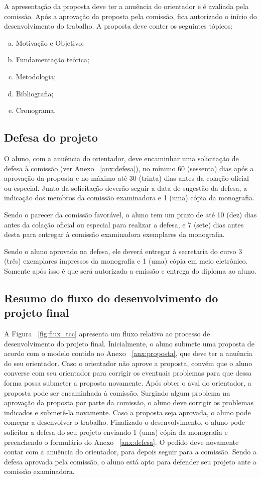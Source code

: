 A apresentação da proposta deve ter a anuência do orientador e é avaliada pela comissão. Após a 
aprovação da proposta pela comissão, fica autorizado o início do desenvolvimento do trabalho.
A proposta deve conter os seguintes tópicos:

\begin{enumerate}[a.]
\item Motivação e Objetivo;
\item Fundamentação teórica;
\item Metodologia;
\item Bibliografia;
\item Cronograma.
\end{enumerate}

\subsection{Defesa do projeto}
\label{sec:defesa}
O aluno, com a anuência do orientador, deve encaminhar uma solicitação de defesa
à comissão (ver Anexo ~\ref{anx:defesa}), no mínimo 60 (sessenta) dias após a aprovação da proposta e no máximo 
até 30 (trinta) dias antes da colação oficial ou especial.
Junto da solicitação deverão seguir a data de sugestão da defesa, a indicação
dos membros da comissão examinadora e 1 (uma) cópia da monografia.

Sendo o parecer da comissão favorável, o aluno tem um prazo de até 10 (dez)
dias antes da colação oficial ou especial para realizar a defesa, e 7 (sete) dias
antes desta para entregar à comissão examinadora exemplares da monografia.

Sendo o aluno aprovado na defesa, ele deverá entregar à secretaria do curso 3 (três)
exemplares impressos da monografia e 1 (uma) cópia em meio eletrônico. Somente após 
isso é que será autorizada a emissão e entrega do diploma ao aluno.

\subsection{Resumo do fluxo do desenvolvimento do projeto final}
A Figura ~\ref{fig:flux_tcc} apresenta um fluxo relativo ao processo de desenvolvimento do projeto final. 
Inicialmente, o aluno submete uma proposta de acordo com o modelo contido no Anexo ~\ref{anx:proposta}, 
que deve ter a anuência do seu orientador. Caso o orientador não aprove a proposta, convém que
o aluno converse com seu orientador para corrigir os eventuais problemas para que dessa forma possa
submeter a proposta novamente. Após obter o aval do orientador, a proposta pode ser encaminhada
à comissão. Surgindo algum problema na aprovação da proposta por parte da comissão, o aluno
deve corrigir os problemas indicados e submetê-la novamente. Caso a proposta seja aprovada, o aluno
pode começar a desenvolver o trabalho. Finalizado o desenvolvimento, o aluno pode solicitar 
a defesa do seu projeto enviando 1 (uma) cópia da monografia e preenchendo o formulário do
Anexo ~\ref{anx:defesa}. O pedido deve novamente contar com a anuência do orientador, para depois
seguir para a comissão. Sendo a defesa aprovada pela comissão, o aluno está apto para defender
seu projeto ante a comissão examinadora.


